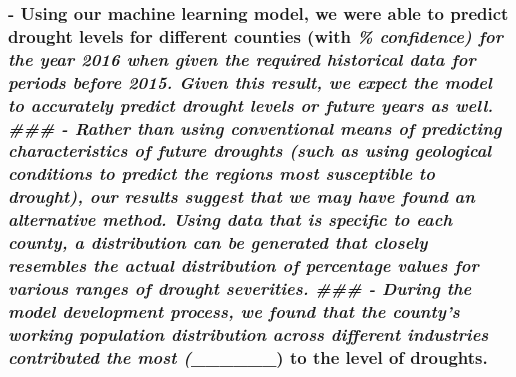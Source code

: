 \documentclass[11pt]{article}
\begin{document}
{\subsubsection{\texorpdfstring{- Using our machine learning model, we
were able to predict drought levels for different counties (with
\textbf{\emph{\% confidence) for the year 2016 when given the required
historical data for periods before 2015. Given this result, we expect
the model to accurately predict drought levels or future years as well.
\#\#\# - Rather than using conventional means of predicting
characteristics of future droughts (such as using geological conditions
to predict the regions most susceptible to drought), our results suggest
that we may have found an alternative method. Using data that is
specific to each county, a distribution can be generated that closely
resembles the actual distribution of percentage values for various
ranges of drought severities. \#\#\# - During the model development
process, we found that the county's working population distribution
across different industries contributed the most (}}\_\_\_\_\_\_) to the
level of
droughts.}{- Using our machine learning model, we were able to predict drought levels for different counties (with \% confidence) for the year 2016 when given the required historical data for periods before 2015. Given this result, we expect the model to accurately predict drought levels or future years as well. \#\#\# - Rather than using conventional means of predicting characteristics of future droughts (such as using geological conditions to predict the regions most susceptible to drought), our results suggest that we may have found an alternative method. Using data that is specific to each county, a distribution can be generated that closely resembles the actual distribution of percentage values for various ranges of drought severities. \#\#\# - During the model development process, we found that the county's working population distribution across different industries contributed the most (\_\_\_\_\_\_) to the level of droughts.}}\label{using-our-machine-learning-model-we-were-able-to-predict-drought-levels-for-different-counties-with-confidence-for-the-year-2016-when-given-the-required-historical-data-for-periods-before-2015.-given-this-result-we-expect-the-model-to-accurately-predict-drought-levels-or-future-years-as-well.---rather-than-using-conventional-means-of-predicting-characteristics-of-future-droughts-such-as-using-geological-conditions-to-predict-the-regions-most-susceptible-to-drought-our-results-suggest-that-we-may-have-found-an-alternative-method.-using-data-that-is-specific-to-each-county-a-distribution-can-be-generated-that-closely-resembles-the-actual-distribution-of-percentage-values-for-various-ranges-of-drought-severities.---during-the-model-development-process-we-found-that-the-countys-working-population-distribution-across-different-industries-contributed-the-most-______-to-the-level-of-droughts.}}
\end{document}
